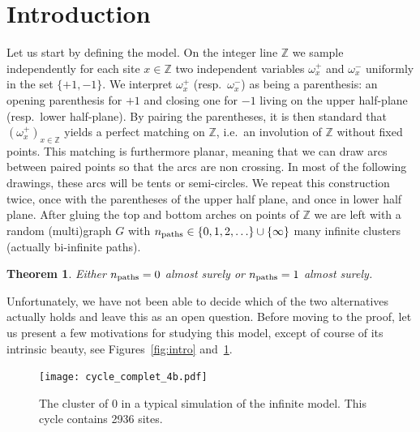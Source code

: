 \documentclass[12pt]{amsart}
\newcommand{\npath}{n_{\rm paths}}
\newtheorem{theorem}{Theorem}
\theoremstyle{remark}
\begin{document}
\section{Introduction}
   \label{s:intro}
   Let us start by defining the model. On the integer line $ \mathbb{Z}$ we sample independently for each site $x \in \mathbb{Z}$ two independent variables $\omega_{x}^{+}$ and $\omega_{x}^{-}$ uniformly in the set $\{+1,-1\}$. We interpret $\omega_{x}^{+}$  (resp.~$\omega_{x}^{-}$) as being a parenthesis: an opening parenthesis for $+1$ and closing one for $-1$ living on the upper half-plane (resp.~lower half-plane). By pairing the parentheses, it is then standard that $(\omega_{x}^{+})_{ x \in \mathbb{Z}}$ yields a perfect matching on $ \mathbb{Z}$, i.e.~an involution  of $ \mathbb{Z}$ without fixed points. This matching is furthermore planar, meaning that we can draw arcs between paired points so that the arcs are non crossing. In most of the following drawings, these arcs will be tents or semi-circles. We  repeat this construction twice, once with the parentheses of the upper half plane, and once in lower half plane. After gluing the top and bottom arches on points of $ \mathbb{Z}$ we are left with a random (multi)graph $G$ with $\npath \in \{0,1,2,\ldots\} \cup \{\infty\}$ many infinite clusters (actually bi-infinite paths).
   
   \begin{theorem} Either $\npath =0$ almost surely or $\npath=1$ almost surely.
\end{theorem}

Unfortunately, we have not been able to decide which of the two alternatives actually holds and leave this as an open question. Before moving to the proof, let us present a few motivations for studying this model, except of course of its intrinsic beauty, see Figures~\ref{fig:intro} and~\ref{fig:one_cycle}.  \medskip
   

\begin{figure}[]
 \begin{center}
 \texttt{[image: cycle\_complet\_4b.pdf]}
 \caption{\label{fig:one_cycle}	The cluster of 0 in a typical simulation of the infinite model. This cycle contains 2936 sites.}
 \end{center}
 \end{figure}
\end{document}
